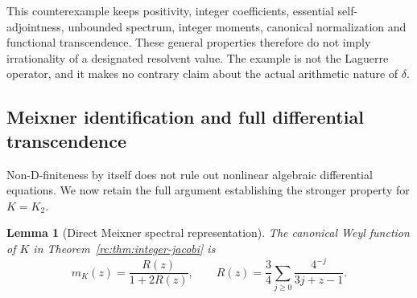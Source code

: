 \documentclass[11pt,a4paper]{article}
\newtheorem{lemma}[theorem]{Lemma}
\theoremstyle{definition}
\theoremstyle{remark}
\theoremstyle{plain}
\numberwithin{equation}{section}
\begin{document}
This counterexample keeps positivity, integer coefficients, essential
self-adjointness, unbounded spectrum, integer moments, canonical
normalization and functional transcendence.  These general properties
therefore do not imply irrationality of a designated resolvent value.
The example is not the Laguerre operator, and it makes no contrary claim
about the actual arithmetic nature of $\delta$.

\subsection{Meixner identification and full differential transcendence}

Non-D-finiteness by itself does not rule out nonlinear algebraic
differential equations.  We now retain the full argument establishing
the stronger property for $K=K_2$.

\begin{lemma}[Direct Meixner spectral representation]\label{rc:lem:meixner}
The canonical Weyl function of $K$ in Theorem~\ref{rc:thm:integer-jacobi}
is
\begin{equation}\label{rc:eq:meixner-R}
 m_K(z)=\frac{R(z)}{1+2R(z)},\qquad
 R(z)=\frac34\sum_{j\ge0}\frac{4^{-j}}{3j+z-1}.
\end{equation}
\end{lemma}
\end{document}
